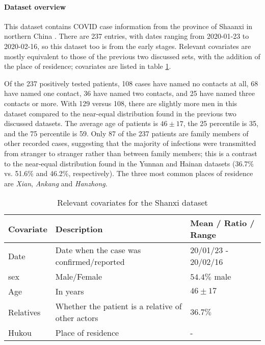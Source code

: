 \paragraph{Dataset overview} This dataset contains COVID case information from the province of Shaanxi in northern China \cite{shaanxi_data}. There are 237 entries, with dates ranging from 2020-01-23 to 2020-02-16, so this dataset too is from the early stages. Relevant covariates are mostly equivalent to those of the previous two discussed sets, with the addition of the place of residence; covariates are listed in table \ref{tab:shanxi_covariates}. 

Of the 237 positively tested patients, 108 cases have named no contacts at all, 68 have named one contact, 36 have named two contacts, and 25 have named three contacts or more.  With 129 versus 108, there are slightly more men in this dataset compared to the near-equal distribution found in the previous two discussed datasets. The average age of patients is $46\pm17$, the 25 percentile is 35, and the 75 percentile is 59. Only 87 of the 237 patients are family members of other recorded cases, suggesting that the majority of infections were transmitted from stranger to stranger rather than between family members; this is a contrast to the near-equal distribution found in the Yunnan and Hainan datasets (36.7\% vs. 51.6\% and 46.2\%, respectively). The three most common places of residence are \emph{Xian}, \emph{Ankang} and \emph{Hanzhong}.

\begin{table}
	\begin{mdframed}
		\begin{tabularx}{\linewidth}{XXX}
		\hline
		\textbf{Covariate} & \textbf{Description} & \textbf{Mean / Ratio / Range}\\
		\hline
		\hline
		Date & Date when the case was confirmed/reported & 20/01/23 - 20/02/16\\
		\hline
		sex & Male/Female & $54.4\%$ male\\
		\hline
		Age & In years & $46\pm17$ \\
		\hline
		Relatives & Whether the patient is a relative of other actors & $36.7\%$\\
		\hline
		Hukou & Place of residence & -\\
		\hline
		\hline
	\end{tabularx}
	\caption{Relevant covariates for the Shanxi dataset}
	\label{tab:shanxi_covariates}
	\end{mdframed}
\end{table}

